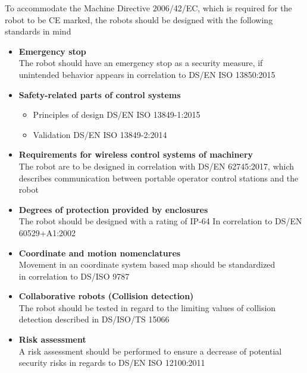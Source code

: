 \vspace{2mm}

To accommodate the Machine Directive 2006/42/EC, which is required for the robot to be CE marked, the robots should be designed with the following standards in mind

\begin{itemize}
\setlength{\itemsep}{0.05\baselineskip}
\item \textbf{Emergency stop}\\
The robot should have an emergency stop as a security measure, if unintended behavior appears in correlation to DS/EN ISO 13850:2015

\item \textbf{Safety-related parts of control systems}
\begin{itemize}
\setlength{\itemsep}{0.05\baselineskip}
\item Principles of design DS/EN ISO 13849-1:2015
\item Validation DS/EN ISO 13849-2:2014
\end{itemize}

\item \textbf{Requirements for wireless control systems of machinery}\\
The robot are to be designed in correlation with DS/EN 62745:2017, which describes communication between portable operator control stations and the robot

\item \textbf{Degrees of protection provided by enclosures}\\
The robot should be designed with a rating of IP-64
In correlation to DS/EN 60529+A1:2002

\item \textbf{Coordinate and motion nomenclatures}\\
Movement in an coordinate system based map should be standardized\\
in correlation to DS/ISO 9787

\item \textbf{Collaborative robots (Collision detection)}\\
The robot should be tested in regard to the limiting values of collision detection described in DS/ISO/TS 15066

\item \textbf{Risk assessment}\\
A risk assessment should be performed to ensure a decrease of potential security risks in regards to DS/EN ISO 12100:2011
\end{itemize}

